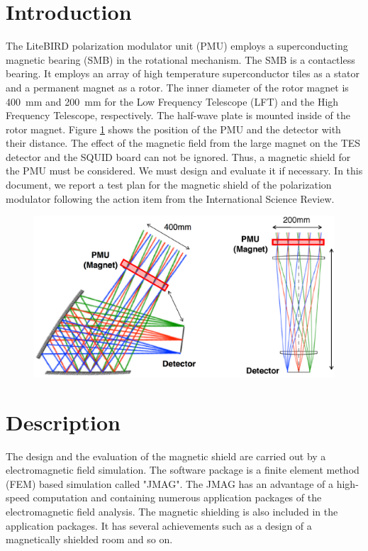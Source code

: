 \documentclass[11pt]{article}
\begin{document}
\section*{Introduction}
The LiteBIRD polarization modulator unit (PMU) employs a superconducting magnetic bearing (SMB) in the rotational mechanism.
The SMB is a contactless bearing.%
It employs an array of high temperature superconductor tiles as a stator and a permanent magnet as a rotor.
The inner diameter of the rotor magnet is 400~mm and 200~mm for the Low Frequency Telescope (LFT) and the High Frequency Telescope, respectively.
The half-wave plate is mounted inside of the rotor magnet.
Figure \ref{fig:telescope} shows the position of the PMU and the detector with their distance.
The effect of the magnetic field from the large magnet on the TES detector and the SQUID board can not be ignored.
Thus, a magnetic shield for the PMU must be considered.
We must design and evaluate it if necessary.
In this document, we report a test plan for the magnetic shield of the polarization modulator following the action item from the International Science Review.

\begin{figure}[htbp]
  \centering
  \includegraphics[width=150mm]{figs/Telescope.eps}
  \caption{}
  \label{fig:telescope}
\end{figure}

\section*{Description}

The design and the evaluation of the magnetic shield are carried out by a electromagnetic field simulation.
The software package is a finite element method (FEM) based simulation called "JMAG".
The JMAG has an advantage of a high-speed computation and containing numerous application packages of the electromagnetic field analysis.
The magnetic shielding is also included in the application packages.
It has several achievements such as a design of a magnetically shielded room and so on.
\end{document}

